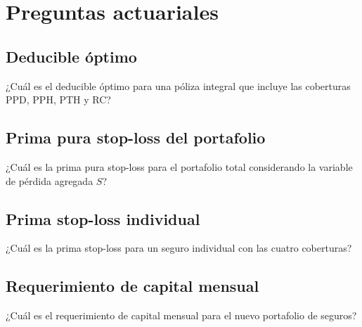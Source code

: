 \section{Preguntas actuariales}

\subsection{Deducible óptimo}

¿Cuál es el deducible óptimo para una póliza integral que incluye las coberturas PPD, PPH, PTH y RC?

\subsection{Prima pura stop-loss del portafolio}

¿Cuál es la prima pura stop-loss para el portafolio total considerando la variable de pérdida agregada $S$?

\subsection{Prima stop-loss individual}

¿Cuál es la prima stop-loss para un seguro individual con las cuatro coberturas?

\subsection{Requerimiento de capital mensual}

¿Cuál es el requerimiento de capital mensual para el nuevo portafolio de seguros?